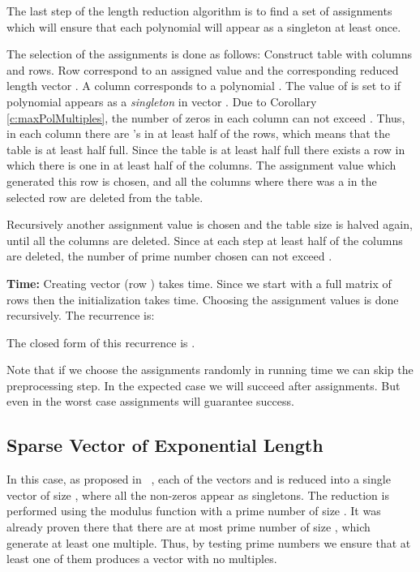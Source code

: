 \documentclass[11pt,amssymb]{article}
\begin{document}
The last step of the length reduction algorithm is to find a set of
 assignments which will ensure that each polynomial will
appear as a singleton at least once.

The selection of the  assignments is done as follows:
Construct table  with  columns and  rows. Row  correspond to an assigned value
 and the corresponding reduced length vector . A
column corresponds to a polynomial . The value of  is set
to  if polynomial  appears as a {\it singleton} in vector
. Due to Corollary \ref{c:maxPolMultiples}, the number of
zeros in each column can not exceed . Thus,
in each column there are 's in at least half of the rows, which
means that the table is at least half full. Since the table is at
least half full there exists a row in which there is one in at least
half of the columns. The assignment value which generated this row
is chosen, and all the columns where there was a  in the selected
row are deleted from the table.

Recursively another assignment value is chosen and the table size is
halved again, until all the columns are deleted. Since at each step
at least half of the columns are deleted, the number of prime number
chosen can not exceed  .

{\bf Time:} Creating vector  (row ) takes  time.
Since we start with a full matrix of  rows then the
initialization takes  time. Choosing the 
assignment values is done recursively. The recurrence is:

The closed form of this recurrence is .

Note that if we choose the assignments randomly in running time we can
skip the preprocessing step. In the expected case we will succeed
after  assignments. But even in the worst case 
assignments will guarantee success.

\subsection{Sparse Vector of Exponential Length}\label{s:Exp}

In this case, as proposed in ~\cite{LR07}, each of the vectors 
and  is reduced into a single vector of size , where
all the non-zeros appear as singletons. The reduction is performed
using the modulus function with a prime number  of size
. It was already proven there that there are at most
 prime number of size , which generate at least one
multiple. Thus, by testing  prime numbers we ensure that at
least one of them produces a vector with no multiples.
\end{document}
